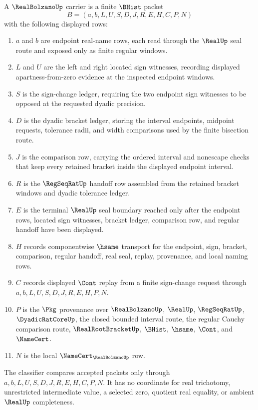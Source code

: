 \begin{definition}
\label{def:real-bolzano-carrier}
A $\RealBolzanoUp$ carrier is a finite $\BHist$ packet
$$
B=(a,b,L,U,S,D,J,R,E,H,C,P,N)
$$
with the following displayed rows:
\begin{enumerate}
\item $a$ and $b$ are endpoint real-name rows, each read through the $\RealUp$ seal route and exposed only as finite regular windows.
\item $L$ and $U$ are the left and right located sign witnesses, recording displayed apartness-from-zero evidence at the inspected endpoint windows.
\item $S$ is the sign-change ledger, requiring the two endpoint sign witnesses to be opposed at the requested dyadic precision.
\item $D$ is the dyadic bracket ledger, storing the interval endpoints, midpoint requests, tolerance radii, and width comparisons used by the finite bisection route.
\item $J$ is the comparison row, carrying the ordered interval and nonescape checks that keep every retained bracket inside the displayed endpoint interval.
\item $R$ is the $\RegSeqRatUp$ handoff row assembled from the retained bracket windows and dyadic tolerance ledger.
\item $E$ is the terminal $\RealUp$ seal boundary reached only after the endpoint rows, located sign witnesses, bracket ledger, comparison row, and regular handoff have been displayed.
\item $H$ records componentwise $\hsame$ transport for the endpoint, sign, bracket, comparison, regular handoff, real seal, replay, provenance, and local naming rows.
\item $C$ records displayed $\Cont$ replay from a finite sign-change request through $a,b,L,U,S,D,J,R,E,H,P,N$.
\item $P$ is the $\Pkg$ provenance over $\RealBolzanoUp$, $\RealUp$, $\RegSeqRatUp$, $\DyadicRatCoreUp$, the closed bounded interval route, the regular Cauchy comparison route, $\RealRootBracketUp$, $\BHist$, $\hsame$, $\Cont$, and $\NameCert$.
\item $N$ is the local $\NameCert_{\RealBolzanoUp}$ row.
\end{enumerate}
The classifier compares accepted packets only through $a,b,L,U,S,D,J,R,E,H,C,P,N$. It has no coordinate for real trichotomy, unrestricted intermediate value, a selected zero, quotient real equality, or ambient $\RealUp$ completeness.
\end{definition}

